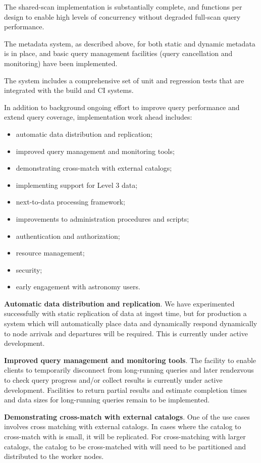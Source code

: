 \documentclass[DM,toc]{lsstdoc}
\begin{document}
The shared-scan implementation is substantially complete, and functions per
design to enable high levels of concurrency without degraded full-scan query
performance.

The metadata system, as described above, for both static and dynamic metadata
is in place, and basic query management facilities (query cancellation and
monitoring) have been implemented.

The system includes a comprehensive set of unit and regression tests that are
integrated with the build and CI systems.

In addition to background ongoing effort to improve query performance and
extend query coverage, implementation work ahead includes:

\begin{itemize}
\item
  automatic data distribution and replication;
\item
  improved query management and monitoring tools;
\item
  demonstrating cross-match with external catalogs;
\item
  implementing support for Level 3 data;
\item
  next-to-data processing framework;
\item
  improvements to administration procedures and scripts;
\item
  authentication and authorization;
\item
  resource management;
\item
  security;
\item
  early engagement with astronomy users.
\end{itemize}

\textbf{Automatic data distribution and replication}. We have experimented
successfully with static replication of data at ingest time, but for
production a system which will automatically place data and dynamically
respond dynamically to node arrivals and departures will be required.
This is currently under active development.

\textbf{Improved query management and monitoring tools}. The facility to
enable clients to temporarily disconnect from long-running queries and later
rendezvous to check query progress and/or collect results is currently under
active development.  Facilities to return partial results and estimate
completion times and data sizes for long-running queries remain to be
implemented.

\textbf{Demonstrating cross-match with external catalogs}. One of the use
cases involves cross matching with external catalogs. In cases where the
catalog to cross-match with is small, it will be replicated. For
cross-matching with larger catalogs, the catalog to be cross-matched with
will need to be partitioned and distributed to the worker nodes.
\end{document}
